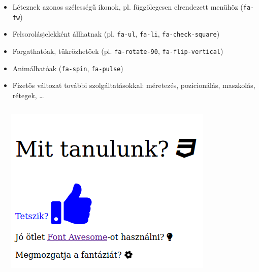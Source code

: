 %
\begin{frame}
  \begin{itemize}
    \item Léteznek azonos szélességű ikonok, pl. függőlegesen elrendezett menühöz (\texttt{fa-fw})
    \item Felsorolásjelekként állhatnak (pl. \texttt{fa-ul}, \texttt{fa-li}, \texttt{fa-check-square})
    \item Forgathatóak, tükrözhetőek (pl. \texttt{fa-rotate-90}, \texttt{fa-flip-vertical})
    \item Animálhatóak (\texttt{fa-spin}, \texttt{fa-pulse})
    \item Fizetős változat további szolgáltatásokkal: méretezés, pozicionálás, maszkolás, rétegek, \dots
  \end{itemize}
\end{frame}

\begin{frame}
  \begin{columns}[c]
      \begin{exampleblock}{}
        \scriptsize
        
        
      \end{exampleblock}
      \includegraphics[width=\textwidth]{fontawesome.png}
  \end{columns}
\end{frame}

